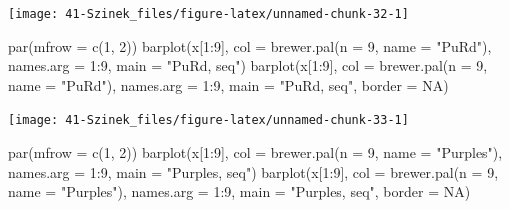\documentclass[
]{book}
\newenvironment{Shaded}{\begin{snugshade}}{\end{snugshade}}
\newcommand{\AttributeTok}[1]{\textcolor[rgb]{0.77,0.63,0.00}{#1}}
\newcommand{\ConstantTok}[1]{\textcolor[rgb]{0.00,0.00,0.00}{#1}}
\newcommand{\DecValTok}[1]{\textcolor[rgb]{0.00,0.00,0.81}{#1}}
\newcommand{\FunctionTok}[1]{\textcolor[rgb]{0.00,0.00,0.00}{#1}}
\newcommand{\NormalTok}[1]{#1}
\newcommand{\SpecialCharTok}[1]{\textcolor[rgb]{0.00,0.00,0.00}{#1}}
\newcommand{\StringTok}[1]{\textcolor[rgb]{0.31,0.60,0.02}{#1}}
\begin{document}
\begin{center}\texttt{[image: 41-Szinek\_files/figure-latex/unnamed-chunk-32-1]} \end{center}

\begin{Shaded}
\begin{Highlighting}[]
\FunctionTok{par}\NormalTok{(}\AttributeTok{mfrow =} \FunctionTok{c}\NormalTok{(}\DecValTok{1}\NormalTok{, }\DecValTok{2}\NormalTok{))}
\FunctionTok{barplot}\NormalTok{(x[}\DecValTok{1}\SpecialCharTok{:}\DecValTok{9}\NormalTok{], }\AttributeTok{col =} \FunctionTok{brewer.pal}\NormalTok{(}\AttributeTok{n =} \DecValTok{9}\NormalTok{, }\AttributeTok{name =} \StringTok{"PuRd"}\NormalTok{), }\AttributeTok{names.arg =} \DecValTok{1}\SpecialCharTok{:}\DecValTok{9}\NormalTok{, }\AttributeTok{main =} \StringTok{"PuRd, seq"}\NormalTok{)}
\FunctionTok{barplot}\NormalTok{(x[}\DecValTok{1}\SpecialCharTok{:}\DecValTok{9}\NormalTok{], }\AttributeTok{col =} \FunctionTok{brewer.pal}\NormalTok{(}\AttributeTok{n =} \DecValTok{9}\NormalTok{, }\AttributeTok{name =} \StringTok{"PuRd"}\NormalTok{), }\AttributeTok{names.arg =} \DecValTok{1}\SpecialCharTok{:}\DecValTok{9}\NormalTok{, }\AttributeTok{main =} \StringTok{"PuRd, seq"}\NormalTok{, }
    \AttributeTok{border =} \ConstantTok{NA}\NormalTok{)}
\end{Highlighting}
\end{Shaded}

\begin{center}\texttt{[image: 41-Szinek\_files/figure-latex/unnamed-chunk-33-1]} \end{center}

\begin{Shaded}
\begin{Highlighting}[]
\FunctionTok{par}\NormalTok{(}\AttributeTok{mfrow =} \FunctionTok{c}\NormalTok{(}\DecValTok{1}\NormalTok{, }\DecValTok{2}\NormalTok{))}
\FunctionTok{barplot}\NormalTok{(x[}\DecValTok{1}\SpecialCharTok{:}\DecValTok{9}\NormalTok{], }\AttributeTok{col =} \FunctionTok{brewer.pal}\NormalTok{(}\AttributeTok{n =} \DecValTok{9}\NormalTok{, }\AttributeTok{name =} \StringTok{"Purples"}\NormalTok{), }\AttributeTok{names.arg =} \DecValTok{1}\SpecialCharTok{:}\DecValTok{9}\NormalTok{, }
    \AttributeTok{main =} \StringTok{"Purples, seq"}\NormalTok{)}
\FunctionTok{barplot}\NormalTok{(x[}\DecValTok{1}\SpecialCharTok{:}\DecValTok{9}\NormalTok{], }\AttributeTok{col =} \FunctionTok{brewer.pal}\NormalTok{(}\AttributeTok{n =} \DecValTok{9}\NormalTok{, }\AttributeTok{name =} \StringTok{"Purples"}\NormalTok{), }\AttributeTok{names.arg =} \DecValTok{1}\SpecialCharTok{:}\DecValTok{9}\NormalTok{, }
    \AttributeTok{main =} \StringTok{"Purples, seq"}\NormalTok{, }\AttributeTok{border =} \ConstantTok{NA}\NormalTok{)}
\end{Highlighting}
\end{Shaded}
\end{document}
